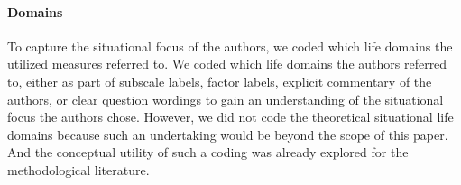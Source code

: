\paragraph{Domains}

To capture the situational focus of the authors, we coded which life
domains the utilized measures referred to. We coded which life domains
the authors referred to, either as part of subscale labels, factor
labels, explicit commentary of the authors, or clear question wordings
to gain an understanding of the situational focus the authors chose.
However, we did not code the theoretical situational life domains
because such an undertaking would be beyond the scope of this paper. And
the conceptual utility of such a coding was already explored for the
methodological literature.
